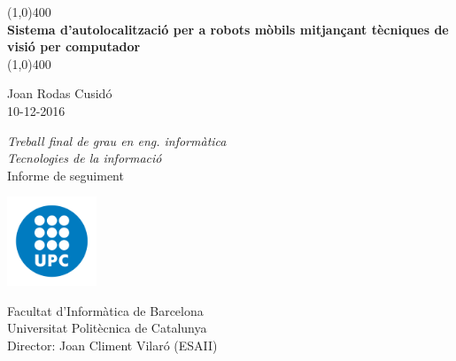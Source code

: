 \documentclass[a4paper,12pt]{report}
\begin{document}

	\begin{titlepage}
		\begin{center}
			\vspace*{1cm}

			\line(1,0){400}\\
			\vspace{0.3cm}
			\Huge
			\textbf{Sistema d'autolocalització per a robots mòbils mitjançant tècniques de visió per computador}\\
			\line(1,0){400}

			\vspace{1.0cm}
			\Large
			Joan Rodas Cusidó\\
			10-12-2016

			\vfill
			\LARGE
			\textit{Treball final de grau en eng. informàtica\\
			Tecnologies de la informació}\\
			\vspace{0.3cm}
			\normalsize{Informe de seguiment}

			\vspace{2cm}

			\includegraphics[width=0.2\textwidth]{images/logo}
			
			\vspace{0.5cm}

			\Large
			Facultat d'Informàtica de Barcelona\\
			Universitat Politècnica de Catalunya\\
			Director: Joan Climent Vilaró (ESAII)
		\end{center}
	\end{titlepage}

	\restoregeometry
	\setcounter{page}{2}

%	
%	
\end{document}
